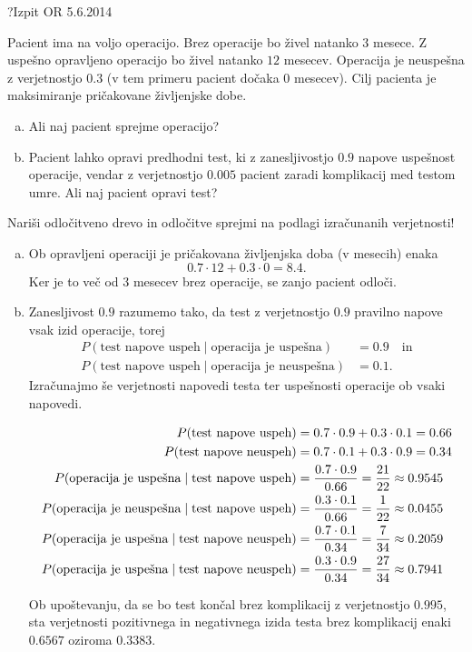 \begin{naloga}{?}{Izpit OR 5.6.2014}
\begin{vprasanje}[operacija]
Pacient ima na voljo operacijo.
Brez operacije bo živel natanko $3$ mesece.
Z uspeš\-no opravljeno operacijo bo živel natanko $12$ mesecev.
Operacija je neuspešna z verjetnostjo $0.3$
(v tem primeru pacient dočaka $0$ mesecev).
Cilj pacienta je maksimiranje pričakovane življenjske dobe.
\begin{enumerate}[(a)]
\item Ali naj pacient sprejme operacijo?
\item Pacient lahko opravi predhodni test,
ki z zanesljivostjo $0.9$ napove uspeš\-nost operacije,
vendar z verjetnostjo $0.005$ pacient zaradi komplikacij med testom umre.
Ali naj pacient opravi test?
\end{enumerate}
Nariši odločitveno drevo
in odločitve sprejmi na podlagi izračunanih ve\-rjet\-no\-sti!
\end{vprasanje}

\begin{odgovor}
\begin{enumerate}[(a)]
\item Ob opravljeni operaciji
je pričakovana življenjska doba (v mesecih) enaka
$$
0.7 \cdot 12 + 0.3 \cdot 0 = 8.4 .
$$
Ker je to več od $3$ mesecev brez operacije, se zanjo pacient odloči.

\item Zanesljivost $0.9$ razumemo tako,
da test z verjetnostjo $0.9$ pravilno napove vsak izid operacije,
torej
\begin{align*}
P(\text{test napove uspeh} \;|\; \text{operacija je uspešna}) &= 0.9
\quad \text{in} \\
P(\text{test napove uspeh} \;|\; \text{operacija je neuspešna}) &= 0.1 .
\end{align*}
Izračunajmo še verjetnosti napovedi testa
ter uspešnosti operacije ob vsaki napovedi.
\begin{small}
\begin{align*}
P(\text{test napove uspeh}) &= 0.7 \cdot 0.9 + 0.3 \cdot 0.1 = 0.66 \\
P(\text{test napove neuspeh}) &= 0.7 \cdot 0.1 + 0.3 \cdot 0.9 = 0.34 \\
P(\text{operacija je uspešna} \;|\; \text{test napove uspeh})
&= {0.7 \cdot 0.9 \over 0.66} = {21 \over 22} \approx 0.9545 \\
P(\text{operacija je neuspešna} \;|\; \text{test napove uspeh})
&= {0.3 \cdot 0.1 \over 0.66} = {1 \over 22} \approx 0.0455 \\
P(\text{operacija je uspešna} \;|\; \text{test napove neuspeh})
&= {0.7 \cdot 0.1 \over 0.34} = {7 \over 34} \approx 0.2059 \\
P(\text{operacija je uspešna} \;|\; \text{test napove neuspeh})
&= {0.3 \cdot 0.9 \over 0.34} = {27 \over 34} \approx 0.7941
\end{align*}
\end{small}
Ob upoštevanju, da se bo test končal brez komplikacij z verjetnostjo $0.995$,
sta verjetnosti pozitivnega in negativnega izida testa brez komplikacij
enaki $0.6567$ oziroma $0.3383$.


\end{enumerate}
\end{odgovor}
\end{naloga}
